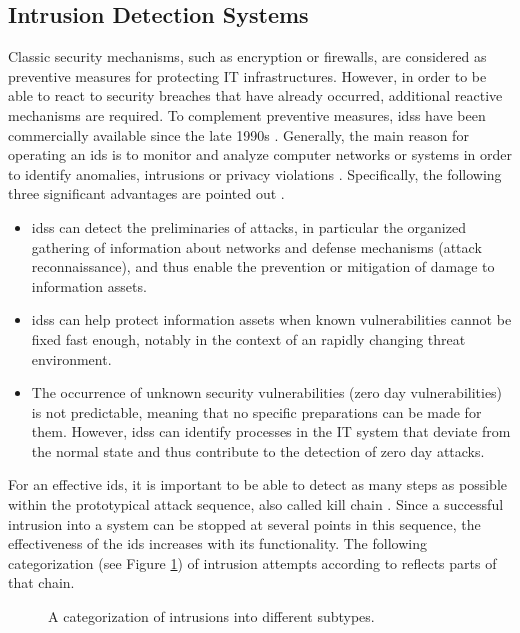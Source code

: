 \documentclass[../../../main.tex]{subfiles}
\begin{document}
\subsection{Intrusion Detection Systems} \label{subsec:intrusion_detection_systems}
Classic security mechanisms, such as encryption or firewalls, are considered as preventive measures for protecting IT infrastructures. However, in order to be able to react to security breaches that have already occurred, additional reactive mechanisms are required. To complement preventive measures, \glspl{ids} have been commercially available since the late 1990s \cite[27]{whitman_principles_2018}. Generally, the main reason for operating an \gls{ids} is to monitor and analyze computer networks or systems in order to identify anomalies, intrusions or privacy violations \cite{hindy2020taxonomy}. Specifically, the following three significant advantages are pointed out \cite[391]{whitman_principles_2018}.

\begin{itemize}
    \item \glspl{ids} can detect the preliminaries of attacks, in particular the organized gathering of information about networks and defense mechanisms (attack reconnaissance), and thus enable the prevention or mitigation of damage to information assets.
    \item \glspl{ids} can help protect information assets when known vulnerabilities cannot be fixed fast enough, notably in the context of an rapidly changing threat environment.
    \item The occurrence of unknown security vulnerabilities (zero day vulnerabilities) is not predictable, meaning that no specific preparations can be made for them. However, \glspl{ids} can identify processes in the IT system that deviate from the normal state and thus contribute to the detection of zero day attacks.
\end{itemize}

For an effective \gls{ids}, it is important to be able to detect as many steps as possible within the prototypical attack sequence, also called kill chain \cite[393]{whitman_principles_2018}. Since a successful intrusion into a system can be stopped at several points in this sequence, the effectiveness of the \gls{ids} increases with its functionality. The following categorization (see Figure \ref{fig:intrusion-taxonomy}) of intrusion attempts according to \cite{kendall1999database} reflects parts of that chain.

\begin{figure}[t]
    \centering
    
    \caption[Intrusion taxonomy]{A categorization of intrusions into different subtypes.}
    \label{fig:intrusion-taxonomy}
\end{figure}
\end{document}
